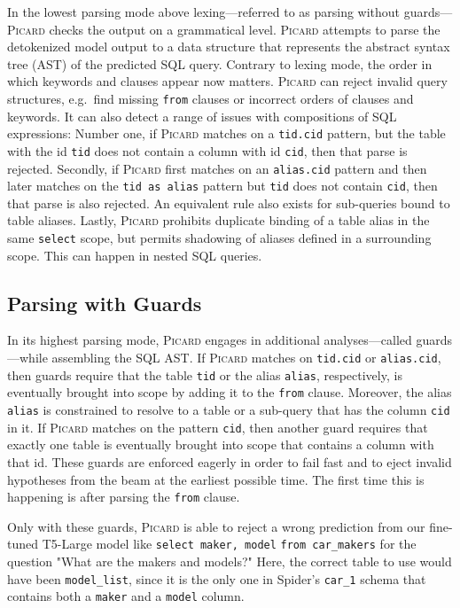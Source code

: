\documentclass[11pt]{article}
\newcommand{\Picard}{\textsc{Picard}}
\begin{document}
In the lowest parsing mode above lexing---referred to as parsing without guards---\Picard{} checks the output on a grammatical level.
\Picard{} attempts to parse the detokenized model output to a data structure
that represents the abstract syntax tree (AST) of the predicted SQL query.
Contrary to lexing mode,
the order in which keywords and clauses appear now matters.
\Picard{} can reject invalid query structures,
e.g.\ find missing \verb+from+ clauses or incorrect orders of clauses and keywords.
It can also detect a range of issues with compositions of SQL expressions:
Number one,
if \Picard{} matches on a \verb+tid.cid+ pattern,
but the table with the id \verb+tid+ does not contain
a column with id \verb+cid+, then that parse is rejected.
Secondly,
if \Picard{} first matches on an \verb+alias.cid+ pattern
and then later matches on the \verb+tid as alias+ pattern
but \verb+tid+ does not contain \verb+cid+, then that parse is also rejected.
An equivalent rule also exists for sub-queries bound to table aliases.
Lastly,
\Picard{} prohibits duplicate binding of a table alias
in the same \verb+select+ scope, but permits shadowing of
aliases defined in a surrounding scope.
This can happen in nested SQL queries.

\subsection{Parsing with Guards}

In its highest parsing mode,
\Picard{} engages in additional analyses---called guards---while assembling the SQL AST.
If \Picard{} matches on \verb+tid.cid+ or \verb+alias.cid+,
then guards require that the table \verb+tid+ or the alias \verb+alias+, respectively,
is eventually brought into scope
by adding it to the \verb+from+ clause.
Moreover,
the alias \verb+alias+ is constrained to resolve to a table or a sub-query
that has the column \verb+cid+ in it.
If \Picard{} matches on the pattern \verb+cid+,
then another guard requires that
exactly one table is eventually brought into scope
that contains a column with that id.
These guards are enforced eagerly
in order to fail fast and to eject invalid hypotheses
from the beam at the earliest possible time.
The first time this is happening is after parsing the \verb+from+ clause.

Only with these guards,
\Picard{} is able to reject a wrong prediction from our fine-tuned T5-Large model like 
\verb+select maker, model+ \verb+from car_makers+
for the question "What are the makers and models?"
Here, the correct table to use would have been \verb+model_list+,
since it is the only one in Spider's \verb+car_1+ schema that
contains both a \verb+maker+ and a \verb+model+ column.
\end{document}
